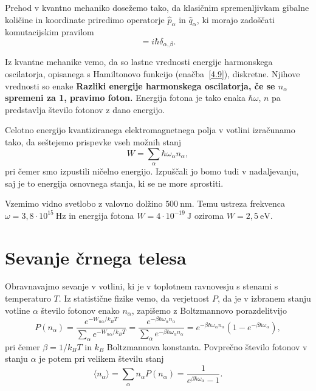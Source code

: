 Prehod v kvantno mehaniko dosežemo tako, da klasičnim spremenljivkam gibalne količine
in koordinate priredimo operatorje $\hat{p}_{\alpha}$ in $\hat{q}_{\alpha}$,
ki morajo zadoščati komutacijskim pravilom 
\begin{equation}
[\hat{q}_{\alpha},\hat{p}_{\beta}]=i\hbar \delta_{\alpha, \beta}.
\label{4.10}
\end{equation}

Iz kvantne mehanike vemo, da so lastne vrednosti energije harmonskega oscilatorja, 
opisanega s Hamiltonovo funkcijo (enačba~\ref{4.9}), diskretne. Njihove vrednosti so enake
{\bf Razliki energije harmonskega oscilatorja, če se $n_{\alpha}$
spremeni za 1, pravimo foton.} Energija
fotona je tako enaka $\hbar \omega$, $n$ pa predstavlja število fotonov z dano energijo.

Celotno energijo kvantiziranega elektromagnetnega polja v votlini
izračunamo tako, da seštejemo prispevke vseh možnih stanj
\begin{equation}
W=\sum_{\alpha}\hbar\omega_{\alpha}n_{\alpha},
\end{equation}
pri čemer smo izpustili ničelno energijo. 
Izpuščali jo bomo tudi v nadaljevanju, saj
je to energija osnovnega stanja, ki se ne more sprostiti. 

\begin{remark}
Vzemimo vidno svetlobo z valovno dolžino $500~\si{\nano\metre}$. Temu ustreza frekvenca
$\omega = 3,8 \cdot 10^{15}~\si{\hertz}$ in energija fotona $W = 4 \cdot 10^{-19}~\si{\joule}$
oziroma $W = 2,5~\mathrm{e}\si{\volt}$.
\end{remark}

\section{Sevanje črnega telesa}
Obravnavajmo sevanje v votlini, ki je v toplotnem ravnovesju s stenami s temperaturo
$T$. Iz statistične fizike vemo, da verjetnost $P$, da je v izbranem stanju 
votline $\alpha$ število fotonov enako $n_{\alpha}$, zapišemo z Boltzmannovo porazdelitvijo
\begin{equation}
P(n_{\alpha})=\frac{e^{-W_{n\alpha}/k_BT}}{\sum_{\alpha}e^{-W_{n\alpha}/k_BT}} = 
\frac{e^{-\beta\hbar\omega_{\alpha}n_{\alpha}}}
{\sum_{\alpha}e^{-\beta\hbar\omega_{\alpha}n_{\alpha}}}=
e^{-\beta\hbar\omega_{\alpha}n_{\alpha}}(1-e^{-\beta\hbar\omega_{\alpha}}),
\label{4.12}
\end{equation}
pri čemer $\beta = 1/k_BT$ in $k_B$ Boltzmannova konstanta. Povprečno število fotonov 
v stanju $\alpha$ je potem pri velikem številu stanj 
\begin{equation}
\langle n_{\alpha}\rangle =\sum_{\alpha}n_{\alpha}P(n_{\alpha})=\frac{1}{e^{\beta\hbar\omega_{\alpha}}-1}.
\label{4.13}
\end{equation}

